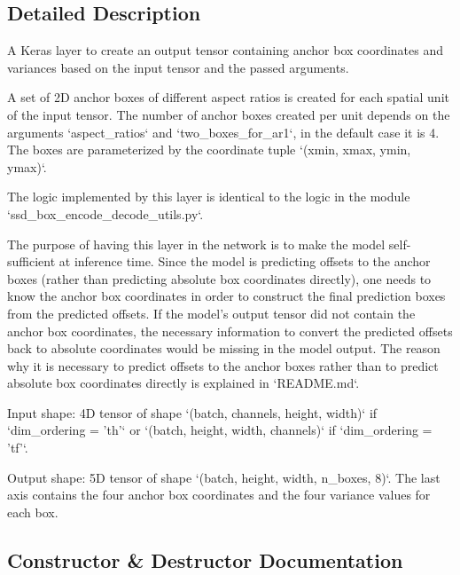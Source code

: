 \subsection{Detailed Description}
\begin{DoxyVerb}A Keras layer to create an output tensor containing anchor box coordinates
and variances based on the input tensor and the passed arguments.

A set of 2D anchor boxes of different aspect ratios is created for each spatial unit of
the input tensor. The number of anchor boxes created per unit depends on the arguments
`aspect_ratios` and `two_boxes_for_ar1`, in the default case it is 4. The boxes
are parameterized by the coordinate tuple `(xmin, xmax, ymin, ymax)`.

The logic implemented by this layer is identical to the logic in the module
`ssd_box_encode_decode_utils.py`.

The purpose of having this layer in the network is to make the model self-sufficient
at inference time. Since the model is predicting offsets to the anchor boxes
(rather than predicting absolute box coordinates directly), one needs to know the anchor
box coordinates in order to construct the final prediction boxes from the predicted offsets.
If the model's output tensor did not contain the anchor box coordinates, the necessary
information to convert the predicted offsets back to absolute coordinates would be missing
in the model output. The reason why it is necessary to predict offsets to the anchor boxes
rather than to predict absolute box coordinates directly is explained in `README.md`.

Input shape:
    4D tensor of shape `(batch, channels, height, width)` if `dim_ordering = 'th'`
    or `(batch, height, width, channels)` if `dim_ordering = 'tf'`.

Output shape:
    5D tensor of shape `(batch, height, width, n_boxes, 8)`. The last axis contains
    the four anchor box coordinates and the four variance values for each box.
\end{DoxyVerb}
 

\subsection{Constructor \& Destructor Documentation}
\mbox{\label{classkeras__utils_1_1keras__layer___anchor_boxes_1_1_anchor_boxes_ae01d3b3883a59f2d3b0590d4bdba82d8}} 
